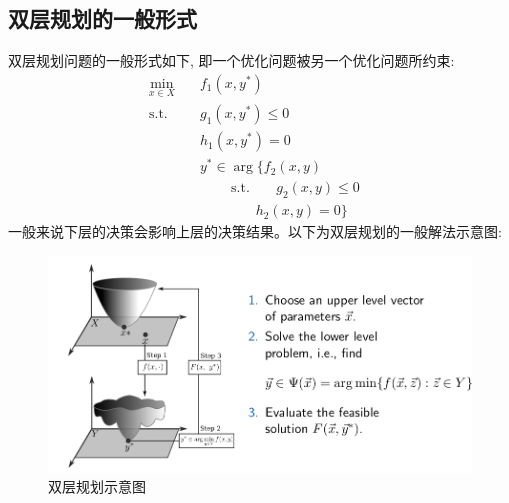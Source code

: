 \documentclass{article}
\begin{document}
\subsection{双层规划的一般形式}
双层规划问题的一般形式如下, 即一个优化问题被另一个优化问题所约束:
\begin{align}
    \min_{x\in X}\quad & f_1(x,y^{*})&  \\
    \mathrm{s.t.}\quad &g_{1}(x,y^{*})\leq0&  \\
    &h_{1}(x,y^{*})=0& \\
    &y^*\in\mathop{\arg\min_{y\in Y}}\{f_2(x,y) \\
    &\qquad~\mathrm{s.t.}~~~~\quad g_{2}(x,y)\leq0\\
    &~~~~~~~~~~~~~~~~~~h_2(x,y)=0\}
\end{align}
一般来说下层的决策会影响上层的决策结果。以下为双层规划的一般解法示意图:
\begin{figure}[H]
    \centering
    \includegraphics[width=1\textwidth]{./pic/bi-level-scheme.png}
    \caption{双层规划示意图}
    \label{fig:two_level_programming}
\end{figure}
\end{document}
